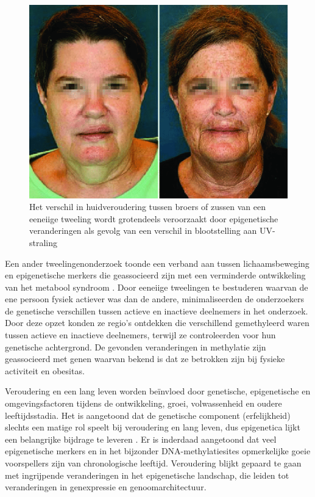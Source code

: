 \documentclass[
  11pt,
]{book}
\begin{document}
\begin{figure}

{\centering \includegraphics[width=0.5\linewidth]{./figs/dentical-twins-with-phenotypic-discordance-due-to-environmental-exposure-Although-MZ} 

}

\caption{Het verschil in huidveroudering tussen broers of zussen van een eeneiige tweeling wordt grotendeels veroorzaakt door epigenetische veranderingen als gevolg van een verschil in blootstelling aan UV-straling \citep{Schwab2017}}\label{fig:epiUV}
\end{figure}

Een ander tweelingenonderzoek toonde een verband aan tussen lichaamsbeweging en epigenetische merkers die geassocieerd zijn met een verminderde ontwikkeling van het metabool syndroom \citep{Duncan2022}. Door eeneiige tweelingen te bestuderen waarvan de ene persoon fysiek actiever was dan de andere, minimaliseerden de onderzoekers de genetische verschillen tussen actieve en inactieve deelnemers in het onderzoek. Door deze opzet konden ze regio's ontdekken die verschillend gemethyleerd waren tussen actieve en inactieve deelnemers, terwijl ze controleerden voor hun genetische achtergrond. De gevonden veranderingen in methylatie zijn geassocieerd met genen waarvan bekend is dat ze betrokken zijn bij fysieke activiteit en obesitas.

Veroudering en een lang leven worden beïnvloed door genetische, epigenetische en omgevingsfactoren tijdens de ontwikkeling, groei, volwassenheid en oudere leeftijdsstadia.
Het is aangetoond dat de genetische component (erfelijkheid) slechts een matige rol speelt bij veroudering en lang leven, dus epigenetica lijkt een belangrijke bijdrage te leveren \citep{Adwan2018}. Er is inderdaad aangetoond dat veel epigenetische merkers en in het bijzonder DNA-methylatiesites opmerkelijke goeie voorspellers zijn van chronologische leeftijd.
Veroudering blijkt gepaard te gaan met ingrijpende veranderingen in het epigenetische landschap, die leiden tot veranderingen in genexpressie en genoomarchitectuur.
\end{document}
